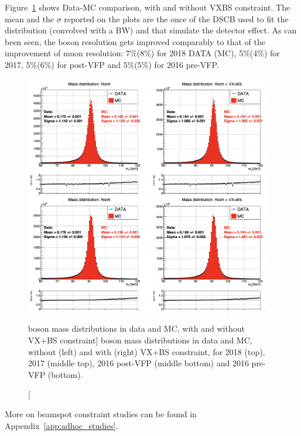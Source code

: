 Figure~\ref{UL_ZBoson_DataMC_comparison_VXBS} shows Data-MC comparison, with and without VXBS constraint.
The mean and the $\sigma$ reported on the plots are the once of the DSCB used to fit the distribution (convolved with a BW) and that simulate the detector effect.
As can been seen, the \PZ boson resolution gets improved comparably to that of the improvement of muon \pT resolution:
7\%(8\%) for 2018 DATA (MC), 5\%(4\%) for 2017, 5\%(6\%) for post-VFP and 5\%(5\%) for 2016 pre-VFP. 
\begin{figure}[!htbp]
\begin{center}
	\includegraphics[width=0.96\textwidth]{figures/higgsmassmeas/vxbs/vxbs_mZdist_2017_2018.png}
    \caption
        [\PZ boson mass distributions in data and MC, with and without VX+BS constraint]
        {\PZ boson mass distributions in data and MC, without (left) and with (right) VX+BS constraint, %
        for 2018 (top), 2017 (middle top), 2016 post-VFP (middle bottom) and 2016 pre-VFP (bottom).
        }
\label{UL_ZBoson_DataMC_comparison_VXBS}
\end{center}
\end{figure}

More on beamspot constraint studies can be found in Appendix~\ref{app:adhoc_studies}. %

